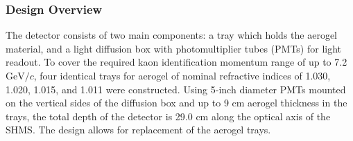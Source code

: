 {\subsubsection{Design Overview}

The detector consists of two main components: a tray
which holds the aerogel material, and a light diffusion box with
photomultiplier tubes (PMTs) for light readout. To cover the required
kaon identification momentum range of up to 7.2 $\textrm{GeV}/c$, four identical
trays for aerogel of nominal refractive indices of 1.030, 1.020,
1.015, and 1.011 were constructed. Using 5-inch diameter PMTs mounted
on the vertical sides of the diffusion box and up to 9 cm aerogel
thickness in the trays, the total depth of the detector is 29.0 cm
along the optical axis of the SHMS. The design allows for replacement
of the aerogel trays.


}
